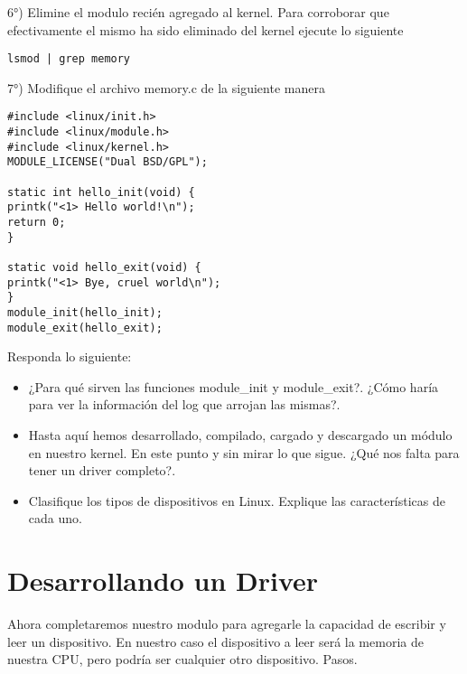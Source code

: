 6°) Elimine el modulo recién agregado al kernel. Para corroborar que efectivamente el mismo ha sido eliminado del kernel ejecute lo siguiente
\begin{verbatim}
lsmod | grep memory
\end{verbatim}

7°) Modifique el archivo memory.c de la siguiente manera
\begin{verbatim}
#include <linux/init.h>
#include <linux/module.h>
#include <linux/kernel.h>
MODULE_LICENSE("Dual BSD/GPL");

static int hello_init(void) {
printk("<1> Hello world!\n");
return 0;
}

static void hello_exit(void) {
printk("<1> Bye, cruel world\n");
}
module_init(hello_init); 
module_exit(hello_exit);
\end{verbatim}

Responda lo siguiente:
\begin{itemize}  
\item ¿Para qué sirven las funciones module\_init y module\_exit?. ¿Cómo haría para ver la información del log que arrojan las mismas?.
\item Hasta aquí hemos desarrollado, compilado, cargado y descargado un módulo en nuestro kernel. En este punto y sin mirar lo que sigue. ¿Qué nos falta para tener un driver completo?.  
\item Clasifique los tipos de dispositivos en Linux. Explique las características de cada uno. 
\end{itemize}  

\section{Desarrollando un Driver}
Ahora completaremos nuestro modulo para agregarle la capacidad de escribir y leer un dispositivo. En nuestro caso el dispositivo a leer será la memoria de nuestra CPU, pero podría ser cualquier otro dispositivo.
Pasos.

